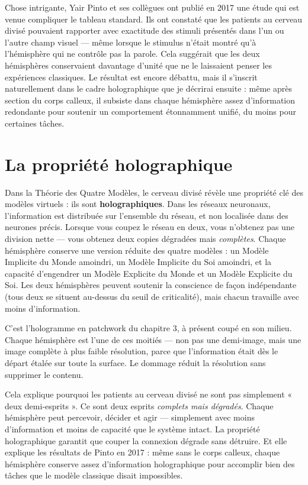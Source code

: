 \documentclass[11pt, twoside, openright]{book}
\begin{document}
Chose intrigante, Yair Pinto et ses collègues ont publié en 2017 une étude qui est venue compliquer le tableau standard. Ils ont constaté que les patients au cerveau divisé pouvaient rapporter avec exactitude des stimuli présentés dans l'un ou l'autre champ visuel --- même lorsque le stimulus n'était montré qu'à l'hémisphère qui ne contrôle pas la parole. Cela suggérait que les deux hémisphères conservaient davantage d'unité que ne le laissaient penser les expériences classiques. Le résultat est encore débattu, mais il s'inscrit naturellement dans le cadre holographique que je décrirai ensuite : même après section du corps calleux, il subsiste dans chaque hémisphère assez d'information redondante pour soutenir un comportement étonnamment unifié, du moins pour certaines tâches.

\section*{La propriété holographique}

Dans la Théorie des Quatre Modèles, le cerveau divisé révèle une propriété clé des modèles virtuels : ils sont \textbf{holographiques}. Dans les réseaux neuronaux, l'information est distribuée sur l'ensemble du réseau, et non localisée dans des neurones précis. Lorsque vous coupez le réseau en deux, vous n'obtenez pas une division nette --- vous obtenez deux copies dégradées mais \textit{complètes}. Chaque hémisphère conserve une version réduite des quatre modèles : un Modèle Implicite du Monde amoindri, un Modèle Implicite du Soi amoindri, et la capacité d'engendrer un Modèle Explicite du Monde et un Modèle Explicite du Soi. Les deux hémisphères peuvent soutenir la conscience de façon indépendante (tous deux se situent au-dessus du seuil de criticalité), mais chacun travaille avec moins d'information.

C'est l'hologramme en patchwork du chapitre 3, à présent coupé en son milieu. Chaque hémisphère est l'une de ces moitiés --- non pas une demi-image, mais une image complète à plus faible résolution, parce que l'information était dès le départ étalée sur toute la surface. Le dommage réduit la résolution sans supprimer le contenu.

Cela explique pourquoi les patients au cerveau divisé ne sont pas simplement « deux demi-esprits ». Ce sont deux esprits \textit{complets mais dégradés}. Chaque hémisphère peut percevoir, décider et agir --- simplement avec moins d'information et moins de capacité que le système intact. La propriété holographique garantit que couper la connexion dégrade sans détruire. Et elle explique les résultats de Pinto en 2017 : même sans le corps calleux, chaque hémisphère conserve assez d'information holographique pour accomplir bien des tâches que le modèle classique disait impossibles.
\end{document}
